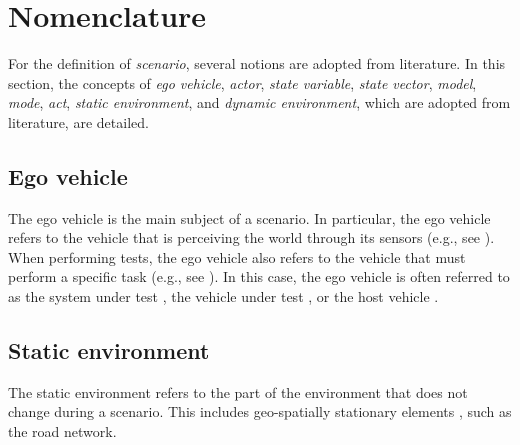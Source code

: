 \section{Nomenclature}
\label{sec:nomenclature}

For the definition of \emph{scenario}, several notions are adopted from literature. 
In this section, the concepts of \emph{ego vehicle}, \emph{actor}, \emph{state variable}, \emph{state vector}, \emph{model}, \emph{mode}, \emph{act}, \emph{static environment}, and \emph{dynamic environment}, \cstartb which are adopted from literature\cendb, are detailed. 

\subsection{Ego vehicle}
\label{sec:ego vehicle}

The ego vehicle is the main subject of a scenario. In particular, the ego vehicle refers to the vehicle that is perceiving the world through its sensors (e.g., see \autocite{Bonnin2014}). When performing tests, the ego vehicle also refers to the vehicle that must perform a specific task (e.g., see \autocite{althoff2017CommonRoad, catapult2018musicc}). In this case, the ego vehicle is often referred to as the system under test \autocite{stellet2015taxonomy}, the vehicle under test \autocite{gietelink2006development}, or the host vehicle \autocite{gietelink2006development}.

\subsection{Static environment}
\label{sec:static environment}

The static environment refers to the part of the environment that does not change during a scenario. This includes geo-spatially stationary elements \autocite{ulbrich2015},  such as the road network.


